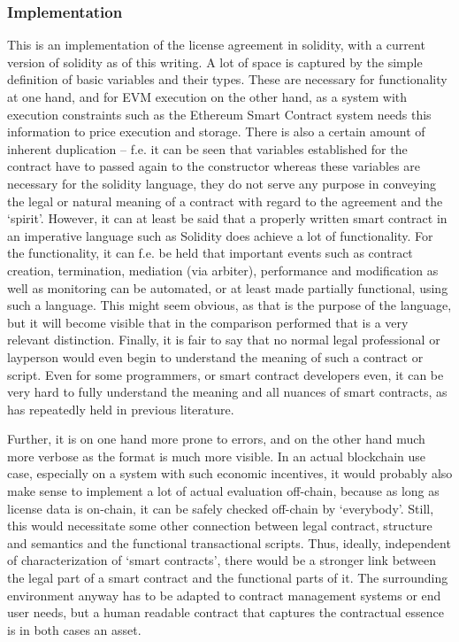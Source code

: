 \documentclass{article}
\begin{document}
\subsubsection{Implementation}
This is an implementation of the license agreement in solidity, with a current version of solidity as of this writing. A lot of space is captured by the simple definition of basic variables and their types. These are necessary for functionality at one hand, and for EVM execution on the other hand, as a system with execution constraints such as the Ethereum Smart Contract system needs this information to price execution and storage. There is also a certain amount of inherent duplication – f.e. it can be seen that variables established for the contract have to passed again to the constructor %
whereas these variables are necessary for the solidity language, they do not serve any purpose in conveying the legal or natural meaning of a contract with regard to the agreement and the ‘spirit’. 
However, it can at least be said that a properly written smart contract
in an imperative language such as Solidity does achieve a lot of functionality. For the functionality, it can f.e. be held that important events such as contract creation, termination, mediation (via arbiter), performance and modification as well as monitoring can be automated, or at least made partially functional, %
using such a language. This might seem obvious,
as that is the purpose of the language, but it will 
become visible that in the comparison performed that is a very relevant distinction.
Finally, it is fair to say that no normal legal professional or layperson would even begin to understand the meaning of such a contract or script. Even for some programmers, or smart contract developers even, it can be very hard to fully understand the meaning and all nuances of smart contracts, as has repeatedly held in previous literature. 

Further, it is on one hand more prone to errors, and on the other hand much more verbose
as the format is much more visible. In an actual blockchain use case, especially on a 
system with such economic incentives,
it would probably also make sense to implement a lot of actual evaluation off-chain, because as long as license data is on-chain, it can be safely checked off-chain by ‘everybody’. Still, this would necessitate some other connection between legal contract, structure and semantics and the functional transactional scripts. Thus, ideally, independent of characterization of ‘smart contracts’, there would be a stronger link between the legal part of a smart contract and the functional parts of it. The surrounding environment anyway has to be adapted to contract management systems or end user needs, but a human readable contract that captures the contractual essence is in both cases an asset.
\end{document}
